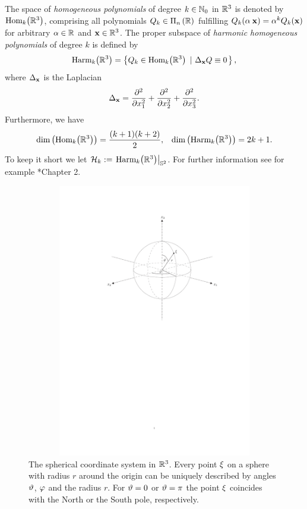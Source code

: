 The space of \emph{homogeneous polynomials} of degree $k \in \mathbb{N}_{0}$ in $\mathbb{R}^3$ is denoted by
$\text{Hom}_k{\hspace{-0.4ex}}\left(\mathbb{R}^3\right)$, comprising all polynomials $Q_k \in \Pi_{n}\left(\mathbb{R}\right)$ fulfilling 
$Q_k{\hspace{-0.4ex}}\left(\alpha\:\mathbf{x}\right) = \alpha^k Q_k{\hspace{-0.4ex}}\left(\mathbf{x}\right)$ for arbitrary $\alpha \in \mathbb{R}$ and $\mathbf{x}
\in \mathbb{R}^3$. The proper subspace of \emph{harmonic homogeneous polynomials} of
degree $k$ is defined by
\begin{equation}
  \nonumber
  \text{Harm}_k{\hspace{-0.4ex}}\left(\mathbb{R}^3\right) = \left\{Q_k \in \text{Hom}_k{\hspace{-0.4ex}}\left(\mathbb{R}^3\right)\ \left|\ \Delta_{\mathbf{x}} Q \equiv 0\right.\right\rbrace,
\end{equation}
where $\Delta_{\mathbf{x}}$ is the Laplacian
\begin{equation}
  \nonumber
  \Delta_{\mathbf{x}} = \frac{\partial^2}{\partial x_1^2} + \frac{\partial^2}{\partial x_2^2} +
  \frac{\partial^2}{\partial x_3^2}.
\end{equation}
Furthermore, we have
\begin{align}
  \nonumber
  \dim{\hspace{-0.4ex}}\left(\text{Hom}_k{\hspace{-0.4ex}}\left(\mathbb{R}^3\right)\right) & = \frac{(k+1)(k+2)}{2}, & 
  \dim{\hspace{-0.4ex}}\left(\text{Harm}_k{\hspace{-0.4ex}}\left(\mathbb{R}^3\right)\right) = 2k+1.
\end{align}
To keep it short we let $\mathcal{H}_k := \left.\text{Harm}_k{\hspace{-0.4ex}}\left(\mathbb{R}^3\right)\right|_{\mathbb{S}^2}$. For 
further information see for example \cite{frgesc}*{Chapter 2}.

\begin{figure}[htb]
  \centering
  \includegraphics[height=12cm,width=12cm]{images/sphere}
  \caption{The spherical coordinate system in $\mathbb{R}^3$. Every point $\mathbf{\xi}$ on a
  sphere with radius $r$ around the origin can be uniquely described by angles 
  $\vartheta$, $\varphi$ and the radius $r$. For $\vartheta = 0$ or
  $\vartheta = \pi$ the point $\mathbf{\xi}$ coincides with the North or the South
  pole, respectively.}
  \label{sphere}
\end{figure}

